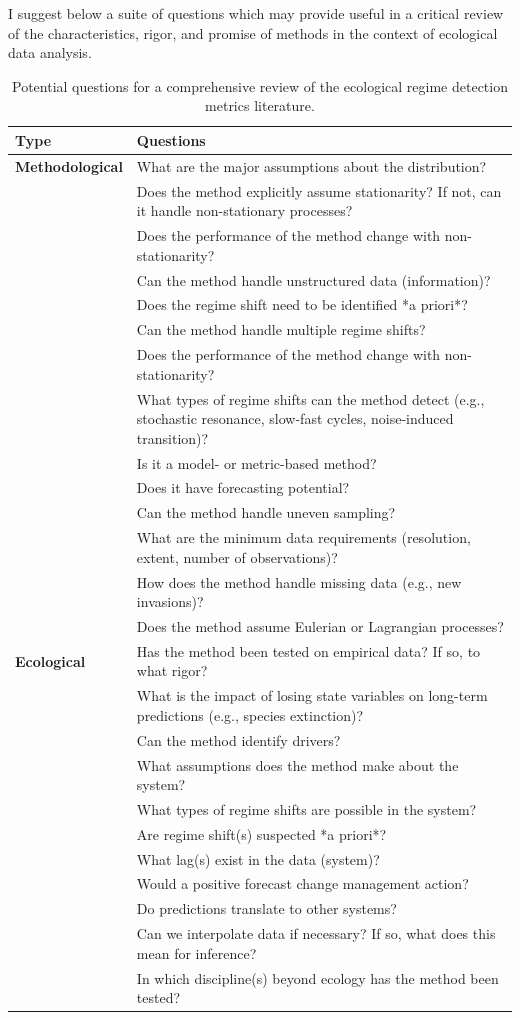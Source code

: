 \documentclass[12pt,twoside,openany]{reedthesis}
\begin{document}
I suggest below a suite of questions which may provide useful in a
critical review of the characteristics, rigor, and promise of methods in
the context of ecological data analysis.
\begin{longtable}{>{\bfseries}l|>{\raggedright\arraybackslash}p{30em}}
\caption{\label{tab:nextStepsTab}Potential questions for a comprehensive review of the ecological regime detection metrics literature.}\\
\toprule
Type & Questions\\
\midrule
Methodological & What are the major assumptions about the distribution?\\
 & Does the method explicitly assume stationarity? If not, can it handle non-stationary processes?\\
 & Does the performance of the method change with non-stationarity?\\
 & Can the method handle unstructured data (information)?\\
 & Does the regime shift need to be identified *a priori*?\\
\addlinespace
 & Can the method handle multiple regime shifts?\\
 & Does the performance of the method change with non-stationarity?\\
 & What types of regime shifts can the method detect (e.g., stochastic resonance, slow-fast cycles, noise-induced transition)?\\
 & Is it a model- or metric-based method?\\
 & Does it have forecasting potential?\\
\addlinespace
 & Can the method handle uneven sampling?\\
 & What are the minimum data requirements (resolution, extent, number of observations)?\\
 & How does the method handle missing data (e.g., new invasions)?\\
 & Does the method assume Eulerian or Lagrangian processes?\\
Ecological & Has the method been tested on empirical data? If so, to what rigor?\\
\addlinespace
 & What is the impact of losing state variables on long-term predictions (e.g., species extinction)?\\
 & Can the method identify drivers?\\
 & What assumptions does the method make about the system?\\
 & What types of regime shifts are possible in the system?\\
 & Are regime shift(s) suspected *a priori*?\\
\addlinespace
 & What lag(s) exist in the data (system)?\\
 & Would a positive forecast change management action?\\
 & Do predictions translate to other systems?\\
 & Can we interpolate data if necessary? If so, what does this mean for inference?\\
 & In which discipline(s) beyond ecology has the method been tested?\\
\bottomrule
\end{longtable}
\end{document}
